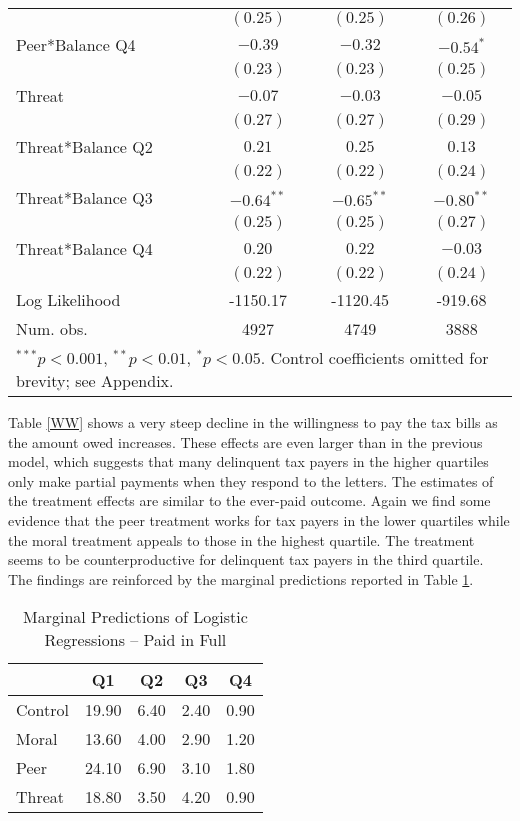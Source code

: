 \documentclass[12pt,titlepage]{article}
\begin{document}
\begin{table}[htbp]
{\begin{center}
\begin{tabular}{l c c c }
                  & $(0.25)$      & $(0.25)$      & $(0.26)$      \\
Peer*Balance Q4   & $-0.39$       & $-0.32$       & $-0.54^{*}$   \\
                  & $(0.23)$      & $(0.23)$      & $(0.25)$      \\
Threat            & $-0.07$       & $-0.03$       & $-0.05$       \\
                  & $(0.27)$      & $(0.27)$      & $(0.29)$      \\
Threat*Balance Q2 & $0.21$        & $0.25$        & $0.13$        \\
                  & $(0.22)$      & $(0.22)$      & $(0.24)$      \\
Threat*Balance Q3 & $-0.64^{**}$  & $-0.65^{**}$  & $-0.80^{**}$  \\
                  & $(0.25)$      & $(0.25)$      & $(0.27)$      \\
Threat*Balance Q4 & $0.20$        & $0.22$        & $-0.03$       \\
                  & $(0.22)$      & $(0.22)$      & $(0.24)$      \\
\hline
Log Likelihood    & -1150.17      & -1120.45      & -919.68       \\
Num. obs.         & 4927          & 4749          & 3888          \\
\hline
\multicolumn{4}{l}{\scriptsize{$^{***}p<0.001$, $^{**}p<0.01$, $^*p<0.05$. Control coefficients omitted for brevity; see Appendix.}}
\end{tabular}
\end{center}
}
\end{table}

Table \ref{WW} shows a very steep decline in the willingness to pay
the tax bills as the amount owed increases.  These effects are even
larger than in the previous model, which suggests that many delinquent
tax payers in the higher quartiles only make partial payments when
they respond to the letters. The estimates of the treatment effects
are similar to the ever-paid outcome. Again we find some evidence that
the peer treatment works for tax payers in the lower quartiles while
the moral treatment appeals to those in the highest quartile. The
treatment seems to be counterproductive for delinquent tax payers in
the third quartile. The findings are reinforced by the marginal
predictions reported in Table \ref{TT}.

\begin{table}[htbp]
\caption{Marginal Predictions of Logistic Regressions -- Paid in Full}  \label{TT}
\centering
\begin{tabular}{lcccc}
  \hline
 & Q1 & Q2 & Q3 & Q4 \\ 
  \hline
Control & 19.90 & 6.40 & 2.40 & 0.90 \\ 
  Moral & 13.60 & 4.00 & 2.90 & 1.20 \\ 
  Peer & 24.10 & 6.90 & 3.10 & 1.80 \\ 
  Threat & 18.80 & 3.50 & 4.20 & 0.90 \\ 
   \hline
\end{tabular}
\end{table}
\end{document}

